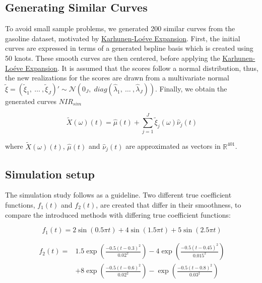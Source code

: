 \documentclass[11pt,twoside,a4paper]{article}
\begin{document}
	\subsection{Generating Similar Curves}
	To avoid small sample problems, we generated 200 similar curves from the gasoline dataset, motivated by \hyperlink{KL}{Karhunen-Lo\'{e}ve Expansion}. First, the initial curves are expressed in terms of a generated bspline basis which is created using 50 knots. These smooth curves are then centered, before applying the \hyperlink{KL}{Karhunen-Lo\'{e}ve Expansion}. It is assumed that the scores follow a normal distribution, thus, the new realizations for the scores are drawn from a multivariate normal $\tilde{\xi} = \left(\tilde{\xi}_{1},\: \dots \:, \tilde{\xi}_{J}\right)' \sim \mathcal{N}(0_J, \; diag(\hat{\lambda}_1,\: \dots\:, \hat{\lambda}_J))$. Finally, we obtain the generated curves $NIR_{sim}$
	
	
		$$\tilde{X}(\omega)(t) = \hat{\mu}(t) + \sum_{j = 1}^{J} \tilde{\xi}_j(\omega) \hat{\nu}_j(t)$$ 

		where
			$\tilde{X}(\omega)(t)$, $\hat{\mu}(t)$ and $\hat{\nu}_j(t)$ are approximated as vectors in $\mathbb{R}^{401}$.
		
	
    
    \subsection{Simulation setup}
	The simulation study follows \cite{Reiss_2007b} as a guideline. Two different true coefficient functions,  $f_1(t)$ and  $f_2(t)$, are created that differ in their smoothness, to compare the introduced methods with differing true coefficient functions:
	
	\begin{equation}
    	f_1(t) = 2\sin(0.5\pi t) + 4\sin(1.5 \pi t) + 5\sin(2.5 \pi t) 
    \end{equation}

    \begin{equation}
    	\begin{split}
    		f_2(t) = & 1.5 \exp{\left(\frac{-0.5(t-0.3)^2}{0.02^2}\right)} - 4 \exp{\left(\frac{-0.5(t-0.45)^2}{0.015^2}\right)} \\
    				 & + 8 \exp{\left(\frac{-0.5(t-0.6)^2}{0.02^2}\right)} -  \exp{\left(\frac{-0.5(t-0.8)^2}{0.03^2}\right)}
    	\end{split}
    \end{equation}
    \vspace{0.2cm}\\
    
\end{document}
